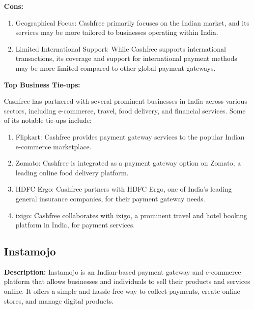 \textbf{Cons:}

\begin{enumerate}
\item Geographical Focus: Cashfree primarily focuses on the Indian market, and its services may be more tailored to businesses operating within India.
\item Limited International Support: While Cashfree supports international transactions, its coverage and support for international payment methods may be more limited compared to other global payment gateways.
\end{enumerate}

\textbf{Top Business Tie-ups:}

Cashfree has partnered with several prominent businesses in India across various sectors, including e-commerce, travel, food delivery, and financial services. Some of its notable tie-ups include:

\begin{enumerate}
\item Flipkart: Cashfree provides payment gateway services to the popular Indian e-commerce marketplace.
\item Zomato: Cashfree is integrated as a payment gateway option on Zomato, a leading online food delivery platform.
\item HDFC Ergo: Cashfree partners with HDFC Ergo, one of India's leading general insurance companies, for their payment gateway needs.
\item ixigo: Cashfree collaborates with ixigo, a prominent travel and hotel booking platform in India, for payment services.
\end{enumerate}

\subsection{Instamojo}

\textbf{Description:}
Instamojo is an Indian-based payment gateway and e-commerce platform that allows businesses and individuals to sell their products and services online. It offers a simple and hassle-free way to collect payments, create online stores, and manage digital products.

